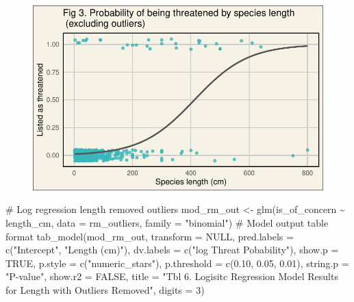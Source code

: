 \documentclass[
  letterpaper,
  DIV=11,
  numbers=noendperiod]{scrartcl}
\newenvironment{Shaded}{\begin{snugshade}}{\end{snugshade}}
\newcommand{\AttributeTok}[1]{\textcolor[rgb]{0.40,0.45,0.13}{#1}}
\newcommand{\CommentTok}[1]{\textcolor[rgb]{0.37,0.37,0.37}{#1}}
\newcommand{\ConstantTok}[1]{\textcolor[rgb]{0.56,0.35,0.01}{#1}}
\newcommand{\DecValTok}[1]{\textcolor[rgb]{0.68,0.00,0.00}{#1}}
\newcommand{\FloatTok}[1]{\textcolor[rgb]{0.68,0.00,0.00}{#1}}
\newcommand{\FunctionTok}[1]{\textcolor[rgb]{0.28,0.35,0.67}{#1}}
\newcommand{\NormalTok}[1]{\textcolor[rgb]{0.00,0.23,0.31}{#1}}
\newcommand{\OtherTok}[1]{\textcolor[rgb]{0.00,0.23,0.31}{#1}}
\newcommand{\SpecialCharTok}[1]{\textcolor[rgb]{0.37,0.37,0.37}{#1}}
\newcommand{\StringTok}[1]{\textcolor[rgb]{0.13,0.47,0.30}{#1}}
\begin{document}
\begin{figure}[H]

{\centering \includegraphics{pdf_files/figure-pdf/unnamed-chunk-8-2.pdf}

}

\end{figure}

\begin{Shaded}
\begin{Highlighting}[]
\CommentTok{\# Log regression length removed outliers}
\NormalTok{mod\_rm\_out }\OtherTok{\textless{}{-}} \FunctionTok{glm}\NormalTok{(is\_of\_concern }\SpecialCharTok{\textasciitilde{}}\NormalTok{ length\_cm, }
                  \AttributeTok{data =}\NormalTok{ rm\_outliers, }
                  \AttributeTok{family =} \StringTok{"binomial"}\NormalTok{)}
\CommentTok{\# Model output table format}
\FunctionTok{tab\_model}\NormalTok{(mod\_rm\_out,}
          \AttributeTok{transform =} \ConstantTok{NULL}\NormalTok{,}
          \AttributeTok{pred.labels =} \FunctionTok{c}\NormalTok{(}\StringTok{"Intercept"}\NormalTok{, }\StringTok{"Length (cm)"}\NormalTok{),}
          \AttributeTok{dv.labels =} \FunctionTok{c}\NormalTok{(}\StringTok{"log Threat Pobability"}\NormalTok{),}
          \AttributeTok{show.p =} \ConstantTok{TRUE}\NormalTok{,}
          \AttributeTok{p.style =} \FunctionTok{c}\NormalTok{(}\StringTok{"numeric\_stars"}\NormalTok{),}
          \AttributeTok{p.threshold =} \FunctionTok{c}\NormalTok{(}\FloatTok{0.10}\NormalTok{, }\FloatTok{0.05}\NormalTok{, }\FloatTok{0.01}\NormalTok{),}
          \AttributeTok{string.p =} \StringTok{"P{-}value"}\NormalTok{,}
          \AttributeTok{show.r2 =} \ConstantTok{FALSE}\NormalTok{,}
          \AttributeTok{title =} \StringTok{"Tbl 6. Logisitc Regression Model Results for Length with Outliers Removed"}\NormalTok{,}
          \AttributeTok{digits =} \DecValTok{3}\NormalTok{)}
\end{Highlighting}
\end{Shaded}
\end{document}
